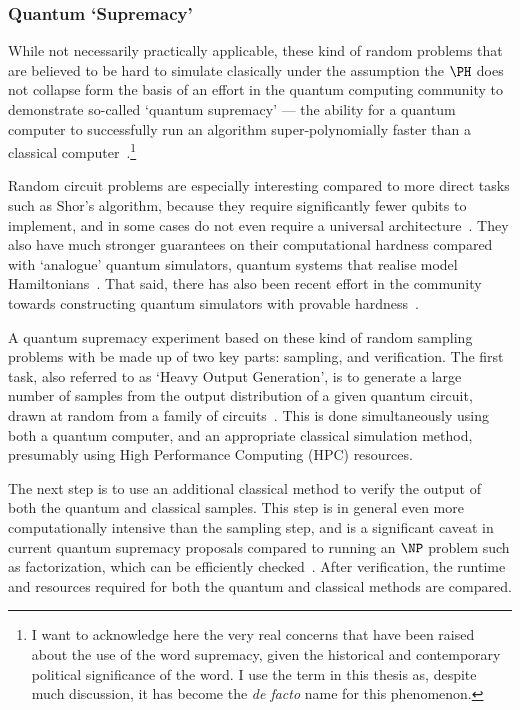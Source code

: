 \subsubsection{Quantum `Supremacy'}
While not necessarily practically applicable, these kind of random problems that are believed to be hard to simulate clasically under the assumption the $\PH$ does not collapse form the basis of an effort in the quantum computing community to demonstrate so-called `quantum supremacy' --- the ability for a quantum computer to successfully run an algorithm super-polynomially faster than a classical computer~\cite{Preskill2012}.\footnote{I want to acknowledge here the very real concerns that have been raised about the use of the word supremacy, given the historical and contemporary political significance of the word. I use the term in this thesis as, despite much discussion, it has become the \emph{de facto} name for this phenomenon.}
\par
Random circuit problems are especially interesting compared to more direct tasks such as Shor's algorithm, because they require significantly fewer qubits to implement, and in some cases do not even require a universal architecture~\cite{Montanaro2017}. They also have much stronger guarantees on their computational hardness compared with `analogue' quantum simulators, quantum systems that realise model Hamiltonians~\cite{Montanaro2017}. That said, there has also been recent effort in the community towards constructing quantum simulators with provable hardness~\cite{Hangleiter2017,Gao2017,BermejoVega2018,Haferkamp2019}.\par
A quantum supremacy experiment based on these kind of random sampling problems with be made up of two key parts: sampling, and verification. The first task, also referred to as `Heavy Output Generation', is to generate a large number of samples from the output distribution of a given quantum circuit, drawn at random from a family of circuits~\cite{Aaronson2016}. This is done simultaneously using both a quantum computer, and an appropriate classical simulation method, presumably using High Performance Computing (HPC) resources.\par
The next step is to use an additional classical method to verify the output of both the quantum and classical samples. This step is in general even more computationally intensive than the sampling step, and is a significant caveat in current quantum supremacy proposals compared to running an $\NP$ problem such as factorization, which can be efficiently checked~\cite{Harrow2017}. After verification, the runtime and resources required for both the quantum and classical methods are compared.\par

